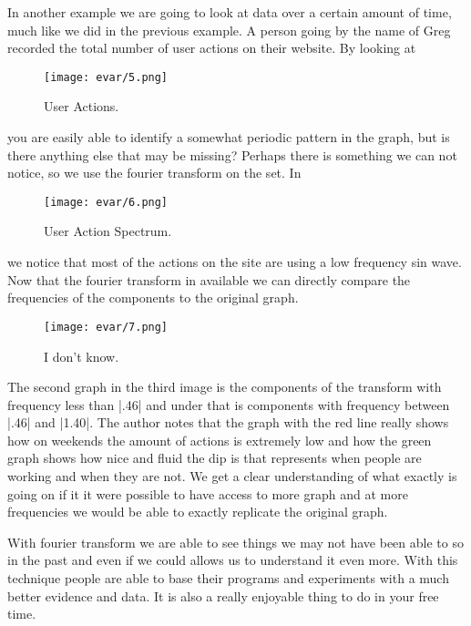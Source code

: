 \documentclass [../article.tex]{subfiles}
\begin{document}
	In another example we are going to look at data over a certain
  amount of time, much like we did in the previous example. A
  person going by the name of Greg recorded the total number of
  user actions on their website. By looking at
  \begin{figure}[htbp]
    \texttt{[image: evar/5.png]}
    \caption{User Actions.}
    \label{fig:useractions}
  \end{figure}
  you are easily able to identify a somewhat periodic pattern in
  the graph, but is there anything else that may be missing?
  Perhaps there is something we can not notice, so we use the
  fourier transform on the set. In
  \begin{figure}[htbp]
    \texttt{[image: evar/6.png]}
    \caption{User Action Spectrum.}
    \label{fig:actionspectrum}
  \end{figure}
  we notice that most of the actions on the site are using a low
  frequency sin wave. Now that the fourier transform in available
  we can directly compare the frequencies of the components to the
  original graph.
  \begin{figure}[htbp]
    \texttt{[image: evar/7.png]}
    \caption{I don't know.}
    \label{fig:idk}
  \end{figure}
  The second graph in the third image is the components of the
  transform with frequency less than |.46| and under that is
  components with frequency between |.46| and |1.40|.  The author
  notes that  the graph with the red line really shows how on
  weekends the amount of actions is extremely low and how the
  green graph shows how nice and fluid the dip is that represents
  when people are working and when they are not. We get a clear
  understanding of what exactly is going on if it it were possible
  to have access to more graph and at more frequencies we would be
  able to exactly replicate the original graph.

	With fourier transform we are able to see things we may not have
  been able to so in the past and even if we could allows us to
  understand it even more. With this technique people are able to
  base their programs and experiments with a much better evidence
  and data. It is also a really enjoyable thing to do in your free
  time.
\end{document}
